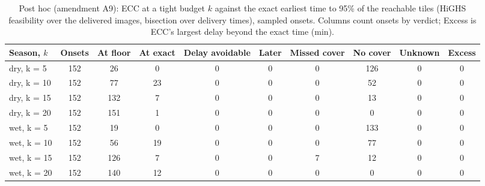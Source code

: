 \begin{table}[!t]
\centering
\footnotesize
\renewcommand{\arraystretch}{1.2}
\setlength{\tabcolsep}{3.5pt}
\caption{Post hoc (amendment A9): ECC at a tight budget $k$ against the exact earliest time to 95\% of the reachable tiles (HiGHS feasibility over the delivered images, bisection over delivery times), sampled onsets. Columns count onsets by verdict; Excess is ECC's largest delay beyond the exact time (min).}
\label{tab:a9_budget}
\begin{tabular}{|l|c|c|c|c|c|c|c|c|c|}
\hline
Season, $k$ & Onsets & At floor & At exact & Delay avoidable & Later & Missed cover & No cover & Unknown & Excess \\
\hline
dry, k = 5 & 152 & 26 & 0 & 0 & 0 & 0 & 126 & 0 & 0 \\
\hline
dry, k = 10 & 152 & 77 & 23 & 0 & 0 & 0 & 52 & 0 & 0 \\
\hline
dry, k = 15 & 152 & 132 & 7 & 0 & 0 & 0 & 13 & 0 & 0 \\
\hline
dry, k = 20 & 152 & 151 & 1 & 0 & 0 & 0 & 0 & 0 & 0 \\
\hline
wet, k = 5 & 152 & 19 & 0 & 0 & 0 & 0 & 133 & 0 & 0 \\
\hline
wet, k = 10 & 152 & 56 & 19 & 0 & 0 & 0 & 77 & 0 & 0 \\
\hline
wet, k = 15 & 152 & 126 & 7 & 0 & 0 & 7 & 12 & 0 & 0 \\
\hline
wet, k = 20 & 152 & 140 & 12 & 0 & 0 & 0 & 0 & 0 & 0 \\
\hline
\end{tabular}
\end{table}
